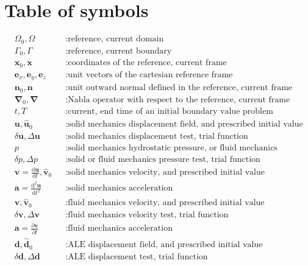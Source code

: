 \documentclass[a4paper,12pt]{report}
\newcommand{\bs}[1]{\boldsymbol{#1}}
\newcommand{\Om}{\mathit{\Omega}}
\newcommand{\Gm}{\mathit{\Gamma}}
\begin{document}
\clearpage

\section{Table of symbols}
\begin{equation}
\nonumber
\begin{aligned}
&\Om_0,\Om &&: \text{reference, current domain} \\
&\Gm_0,\Gm &&: \text{reference, current boundary} \\
&\bs{x}_0, \bs{x} &&: \text{coordinates of the reference, current frame} \\
&\bs{e}_x, \bs{e}_y, \bs{e}_z &&: \text{unit vectors of the cartesian reference frame} \\
&\bs{n}_0, \bs{n} &&: \text{unit outward normal defined in the reference, current frame} \\
&\bs{\nabla}_{0},\bs{\nabla} &&: \text{Nabla operator with respect to the reference, current frame} \\
&t, T &&: \text{current, end time of an initial boundary value problem} \\
&\bs{u}, \hat{\bs{u}}_{0} &&: \text{solid mechanics displacement field, and prescribed initial value} \\
&\delta\bs{u}, \Delta\bs{u} &&: \text{solid mechanics displacement test, trial function} \\
& p &&: \text{solid mechanics hydrostatic pressure, or fluid mechanics pressure} \\
& \delta p, \Delta p &&: \text{solid or fluid mechanics pressure test, trial function} \\
&\bs{v}=\frac{\mathrm{d}\bs{u}}{\mathrm{d}t}, \hat{\bs{v}}_{0} &&: \text{solid mechanics velocity, and prescribed initial value} \\
&\bs{a}=\frac{\mathrm{d}^2\bs{u}}{\mathrm{d}t^2} &&: \text{solid mechanics acceleration} \\
&\bs{v}, \hat{\bs{v}}_{0} &&: \text{fluid mechanics velocity, and prescribed initial value} \\
&\delta\bs{v}, \Delta\bs{v} &&: \text{fluid mechanics velocity test, trial function} \\
&\bs{a}=\frac{\partial\bs{v}}{\partial t} &&: \text{fluid mechanics acceleration} \\
&\bs{d}, \hat{\bs{d}}_{0} &&: \text{ALE displacement field, and prescribed initial value} \\
&\delta\bs{d}, \Delta\bs{d} &&: \text{ALE displacement test, trial function} \\

\end{aligned}
\end{equation}
\end{document}
